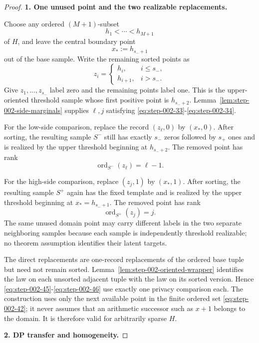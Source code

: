\begin{proof}

\textbf{1. One unused point and the two realizable replacements.}

Choose any ordered \((M+1)\)-subset
\[
h_1<\cdots<h_{M+1}
\tag{42}\label{eq:step-002-42}
\]
of \(H\), and leave the central boundary point
\[
x_*:=h_{s_-+1}
\tag{43}\label{eq:step-002-43}
\]
out of the base sample. Write the remaining sorted points as
\[
z_i=
\begin{cases}
h_i,&i\le s_-,\\
h_{i+1},&i>s_-.
\end{cases}
\tag{44}\label{eq:step-002-44}
\]
Give \(z_1,\ldots,z_{s_-}\) label zero and the remaining points label one. This is the upper-oriented threshold sample whose first positive point is \(h_{s_-+2}\). Lemma~\ref{lem:step-002-side-marginals} supplies \(\ell,j\) satisfying \eqref{eq:step-002-33}-\eqref{eq:step-002-34}.

For the low-side comparison, replace the record \((z_\ell,0)\) by \((x_*,0)\). After sorting, the resulting sample \(S^-\) still has exactly \(s_-\) zeros followed by \(s_+\) ones and is realized by the upper threshold beginning at \(h_{s_-+2}\). The removed point has rank
\[
\operatorname{ord}_{S^-}(z_\ell)=\ell-1.
\tag{45}\label{eq:step-002-45}
\]

For the high-side comparison, replace \((z_j,1)\) by \((x_*,1)\). After sorting, the resulting sample \(S^+\) again has the fixed template and is realized by the upper threshold beginning at \(x_*=h_{s_-+1}\). The removed point has rank
\[
\operatorname{ord}_{S^+}(z_j)=j.
\tag{46}\label{eq:step-002-46}
\]
The same unused domain point may carry different labels in the two separate neighboring samples because each sample is independently threshold realizable; no theorem assumption identifies their latent targets.

The direct replacements are one-record replacements of the ordered base tuple but need not remain sorted. Lemma~\ref{lem:step-002-oriented-wrapper} identifies the law on each unsorted adjacent tuple with the law on its sorted version. Hence \eqref{eq:step-002-45}-\eqref{eq:step-002-46} use exactly one privacy comparison each. The construction uses only the next available point in the finite ordered set \eqref{eq:step-002-42}; it never assumes that an arithmetic successor such as \(x+1\) belongs to the domain. It is therefore valid for arbitrarily sparse \(H\).

\textbf{2. DP transfer and homogeneity.}


\end{proof}
